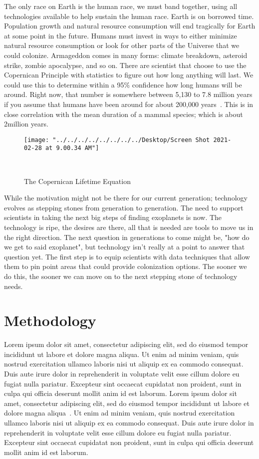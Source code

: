 \documentclass[letterpaper, 10 pt, conference]{ieeeconf}  %
\begin{document}
The only race on Earth is the human race, we must band together, using all technologies available to help sustain the human race. Earth is on borrowed time. Population growth and natural resource consumption will end tragically for Earth at some point in the future. Humans must invest in ways to either minimize natural resource consumption or look for other parts of the Universe that we could colonize. Armageddon comes in many forms: climate breakdown, asteroid strike, zombie apocalypse, and so on. There are scientist that choose to use the Copernican Principle with statistics to figure out how long anything will last. We could use this to determine within a 95\% confidence how long humans will be around. Right now, that number is somewhere between 5,130 to 7.8 million years if you assume that humans have been around for about 200,000 years~\cite{Koehrsen2018}. This is in close correlation with the mean duration of a mammal species; which is about 2million years. 

\begin{figure}
	\centering
	\texttt{[image: "../../../../../../../../Desktop/Screen Shot 2021-02-28 at 9.00.34 AM"]}
	\caption[The Copernican Lifetime Equation]{The Copernican Lifetime Equation}~\cite{Koehrsen2018}
	\label{fig:screen-shot-2021-02-28-at-9}
\end{figure}

While the motivation might not be there for our current generation; technology evolves as stepping stones from generation to generation. The need to support scientists in taking the next big steps of finding exoplanets is now. The technology is ripe, the desires are there, all that is needed are tools to move us in the right direction. The next question in generations to come might be, "how do we get to said exoplanet", but technology isn't really at a point to answer that question yet. The first step is to equip scientists with data techniques that allow them to pin point areas that could provide colonization options. The sooner we do this, the sooner we can move on to the next stepping stone of technology needs.

\section{Methodology}

Lorem ipsum dolor sit amet, consectetur adipiscing elit, sed do eiusmod tempor incididunt ut labore et dolore magna aliqua. Ut enim ad minim veniam, quis nostrud exercitation ullamco laboris nisi ut aliquip ex ea commodo consequat. Duis aute irure dolor in reprehenderit in voluptate velit esse cillum dolore eu fugiat nulla pariatur. Excepteur sint occaecat cupidatat non proident, sunt in culpa qui officia deserunt mollit anim id est laborum. Lorem ipsum dolor sit amet, consectetur adipiscing elit, sed do eiusmod tempor incididunt ut labore et dolore magna aliqua~\cite{PopulationClock202007}. Ut enim ad minim veniam, quis nostrud exercitation ullamco laboris nisi ut aliquip ex ea commodo consequat. Duis aute irure dolor in reprehenderit in voluptate velit esse cillum dolore eu fugiat nulla pariatur. Excepteur sint occaecat cupidatat non proident, sunt in culpa qui officia deserunt mollit anim id est laborum.
\end{document}
